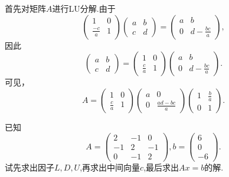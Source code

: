 ﻿\documentclass{book} \usepackage{exsheets} \usepackage{xeCJK}
\begin{document}
\begin{solution}
  首先对矩阵$A$进行LU分解.由于
$$
\begin{pmatrix}
  1&0\\
  \frac{-c}{a}&1
\end{pmatrix}
\begin{pmatrix}
  a&b\\
  c&d
\end{pmatrix}=
\begin{pmatrix}
  a&b\\
  0&d-\frac{bc}{a}
\end{pmatrix},
$$
因此
$$
\begin{pmatrix}
  a&b\\
  c&d
\end{pmatrix}=
\begin{pmatrix}
  1&0\\
  \frac{c}{a}&1
\end{pmatrix}
\begin{pmatrix}
  a&b\\
  0&d-\frac{bc}{a}
\end{pmatrix}.
$$
可见，
$$
A=
\begin{pmatrix}
  1&0\\
  \frac{c}{a}&1
\end{pmatrix}
\begin{pmatrix}
  a&0\\
  0&\frac{ad-bc}{a}
\end{pmatrix}
\begin{pmatrix}
  1& \frac{b}{a}\\
  0&1
\end{pmatrix}.
$$
\end{solution}
\begin{question}
  已知
$$
A=
\begin{pmatrix}
  2&-1&0\\
  -1&2&-1\\
  0&-1&2
\end{pmatrix},b=
\begin{pmatrix}
  6\\
  0\\
  -6
\end{pmatrix}.
$$
试先求出因子$L,D,U$,再求出中间向量$c$,最后求出$Ax=b$的解.
\end{question}
\end{document}
